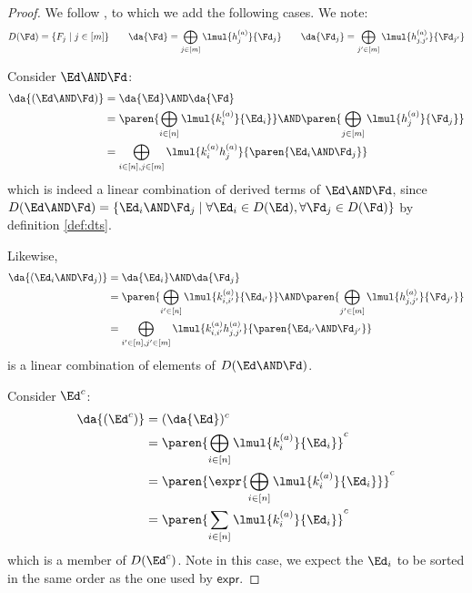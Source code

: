\documentclass[a4paper,USenglish]{lipics}
\begin{document}
\begin{proof}
  We follow \citep[proof of Theorem~2]{lombardy.2005.tcs}, to which we add
  the following cases.  We note:
  \begin{gather*}
    D(\Fd)     = \{F_j \mid j \in [m]\} \qquad
    \da{\Fd}   = \bigoplus_{j\in[m]}  \lmul{h_j^{(a)}}{\Fd_j} \qquad
    \da{\Fd_j} = \bigoplus_{j'\in[m]} \lmul{h_{j,j'}^{(a)}}{\Fd_{j'}}
  \end{gather*}

  Consider $\Ed \AND \Fd$:
  \begin{align*}
    \da{(\Ed\AND\Fd)}
    &= \da{\Ed} \AND \da{\Fd} \\
    &= \paren{\bigoplus_{i\in[n]} \lmul{k_i^{(a)}}{\Ed_i}}
      \AND \paren{\bigoplus_{j\in[m]} \lmul{h_j^{(a)}}{\Fd_j}} \\
    &= \bigoplus_{i\in[n], j\in[m]}
      \lmul{k_i^{(a)}h_j^{(a)}}{\paren{\Ed_i\AND\Fd_j}}
  \end{align*}
  which is indeed a linear combination of derived terms of $\Ed\AND\Fd$,
  since
  $D(\Ed \AND \Fd) = \{\Ed_i\AND\Fd_j \mid \forall \Ed_i \in D(\Ed), \forall
  \Fd_j\in D(\Fd)\}$ by definition \cref{def:dts}.

  Likewise,
  \begin{align*}
    \da{(\Ed_i\AND\Fd_j)}
    &= \da{\Ed_i} \AND \da{\Fd_j} \\
    &= \paren{\bigoplus_{i'\in[n]} \lmul{k_{i,i'}^{(a)}}{\Ed_{i'}}}
      \AND \paren{\bigoplus_{j'\in[m]} \lmul{h_{j,j'}^{(a)}}{\Fd_{j'}}} \\
    &= \bigoplus_{i'\in[n], j'\in[m]}
      \lmul{k_{i,i'}^{(a)}h_{j,j'}^{(a)}}{\paren{\Ed_{i'}\AND\Fd_{j'}}}
  \end{align*}
  is a linear combination of elements of $D(\Ed\AND\Fd)$.

  Consider $\Ed^c$:
  \begin{align*}
    \da{(\Ed^c)}
    &= (\da{\Ed})^c \\
    &= \paren{\bigoplus_{i\in[n]} \lmul{k_i^{(a)}}{\Ed_i}}^c \\
    &= \paren{\expr{\bigoplus_{i\in[n]} \lmul{k_i^{(a)}}{\Ed_i}}}^c \\
    &= \paren{\sum_{i\in[n]} \lmul{k_i^{(a)}}{\Ed_i}}^c
  \end{align*}
  which is a member of $D(\Ed^c)$.  Note in this case, we expect the $\Ed_i$
  to be sorted in the same order as the one used by $\mathsf{expr}$.


\end{proof}
\end{document}
